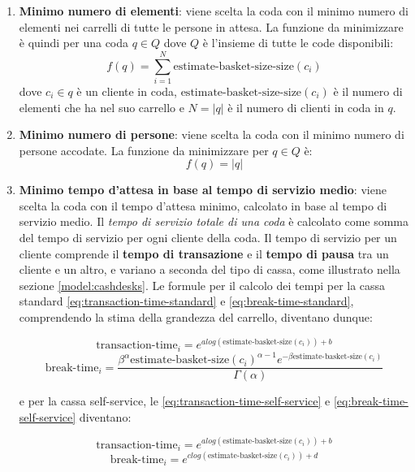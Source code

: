 \begin{enumerate}
\item \textbf{Minimo numero di elementi}: viene scelta la coda con il minimo numero di elementi nei carrelli di tutte le persone in attesa. La funzione da minimizzare è quindi per una coda $q \in Q$ dove $Q$ è l'insieme di tutte le code disponibili:
\begin{equation}
f(q) = \sum\limits_{i=1}^N \text{estimate-basket-size-size}(c_i) 
\end{equation}
dove $c_i \in q$ è un cliente in coda, $\text{estimate-basket-size-size}(c_i)$ è il numero di elementi che ha nel suo carrello e $N = |q|$ è il numero di clienti in coda in $q$.
\item \textbf{Minimo numero di persone}: viene scelta la coda con il minimo numero di persone accodate. La funzione da minimizzare per $q \in Q$ è:
\begin{equation}
f(q) = |q|
\end{equation}
\item \textbf{Minimo tempo d'attesa in base al tempo di servizio medio}:
viene scelta la coda con il tempo d'attesa minimo, calcolato in base al tempo di servizio medio.
Il \textit{tempo di servizio totale di una coda} è calcolato come somma del tempo di servizio per ogni cliente della coda. Il tempo di servizio per un cliente comprende il \textbf{tempo di transazione} e il \textbf{tempo di pausa} tra un cliente e un altro, e variano a seconda del tipo di cassa, come illustrato nella sezione \ref{model:cashdesks}. Le formule per il calcolo dei tempi per la cassa standard \ref{eq:transaction-time-standard} e \ref{eq:break-time-standard}, comprendendo la stima della grandezza del carrello, diventano dunque:

\begin{equation}\label{eq:transaction-time-standard-estimate}
\text{transaction-time}_i = e^{a log(\text{estimate-basket-size}(c_i)) + b}
\end{equation}
\begin{equation}\label{eq:break-time-standard-estimate}
\text{break-time}_i = \frac{\beta^{\alpha} \text{estimate-basket-size}(c_i)^{\alpha - 1} e^{- \beta \text{estimate-basket-size}(c_i)}}{\Gamma (\alpha)}
\end{equation}

e per la cassa self-service, le \ref{eq:transaction-time-self-service} e \ref{eq:break-time-self-service} diventano:

\begin{equation}\label{eq:transaction-time-self-service-estimate}
\text{transaction-time}_i = e^{a log(\text{estimate-basket-size}(c_i)) + b}
\end{equation}
\begin{equation}\label{eq:break-time-self-service-estimate}
\text{break-time}_i = e^{c log(\text{estimate-basket-size}(c_i)) + d}
\end{equation}


\end{enumerate}
